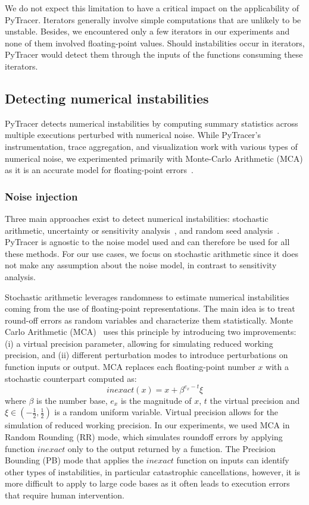 \documentclass[10pt,journal,compsoc]{IEEEtran}
\newcommand{\pytracer}[0]{PyTracer\xspace}
\DeclareRobustCommand{\add}[1]{\textcolor{ao(english)}{#1}}%
\DeclareRobustCommand{\add}[1]{#1}
\begin{document}
We do not expect this limitation to have a critical impact on the
applicability of \pytracer. 
Iterators generally involve simple computations that are unlikely to be
unstable. Besides, we encountered only a few iterators in our
experiments and none of them involved floating-point values. Should
instabilities occur in iterators, \pytracer would detect them through the
inputs of the functions consuming these iterators. 

\subsection{Detecting numerical instabilities}

\pytracer detects numerical instabilities by computing summary statistics across
multiple executions perturbed with numerical noise. While \pytracer's
instrumentation, trace aggregation, and visualization work with various types of
numerical noise, we experimented primarily with Monte-Carlo Arithmetic (MCA) as
it is an accurate model for floating-point errors~\cite{verificarlo}.

\subsubsection{Noise injection}
\label{sec:fuzzy}

Three  main  approaches  exist  to  detect  numerical  instabilities:
stochastic  arithmetic,  uncertainty  or  sensitivity analysis~\cite{helton2006survey}, and random
seed analysis~\cite{hellekalek1998good}. PyTracer is agnostic to the noise model used and can therefore
be used for all these methods.  For our use cases, we focus on stochastic
arithmetic since it does not make any assumption about the noise model, in
contrast to sensitivity analysis.

Stochastic arithmetic leverages randomness to estimate numerical instabilities
coming from the use of floating-point representations. The main idea is to treat
round-off errors as random variables and characterize them statistically. Monte 
Carlo Arithmetic (MCA)~\cite{parker1997monte} uses this principle by introducing
two improvements: (i) a virtual precision parameter, allowing for simulating
reduced working precision, and (ii) different perturbation modes to introduce
perturbations on function inputs or output. MCA replaces each floating-point
number $x$ with a stochastic counterpart computed as:
\[
    inexact(x) =  x + \beta^{e_x - t}\xi
\]
where $\beta$ is the number base, $e_x$ is the magnitude of $x$, $t$ the virtual
precision and $\xi\! \in\! (-\frac{1}{2},\frac{1}{2})$ is a random uniform variable.
Virtual precision allows for the simulation of reduced working precision.
In our experiments, we used MCA in Random Rounding (RR) mode, which
simulates roundoff errors by applying function $inexact$ only to the
output returned by a function. The Precision Bounding (PB) mode 
\add{that applies the $inexact$ function on inputs}
can identify other types of instabilities, in particular catastrophic
cancellations, however, it is more difficult to apply to large code bases
as it often leads to execution errors that require human intervention.
\end{document}
